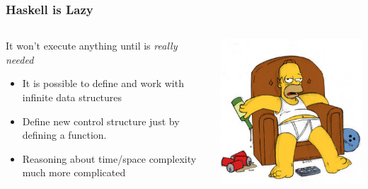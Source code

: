 	\begin{frame}[fragile]\frametitle{Haskell is Lazy}
			\begin{columns}[T] %
			\begin{column}{.67\textwidth}

			\begin{alertblock}{It won't execute anything until is \emph{really
			needed}} 
					\begin{itemize}
					  	\item It is possible to define and work with infinite data structures
					  \item Define new control structure just by defining a function.
					  \item Reasoning about time/space complexity much more complicated
					\end{itemize}
			\end{alertblock}
			

			\end{column}%
			\hfill%
			\begin{column}{.45\textwidth}
			\includegraphics[scale=0.5]{./images/homer}
			\end{column}%
			\end{columns}
			
			
	\end{frame}
	
	
	
